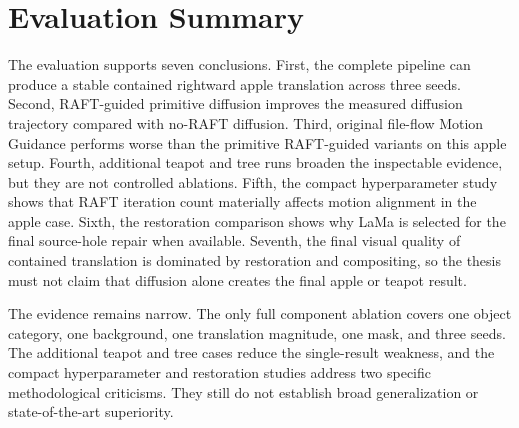 \section{Evaluation Summary}

The evaluation supports seven conclusions. First, the complete pipeline can produce a stable contained rightward apple translation across three seeds. Second, RAFT-guided primitive diffusion improves the measured diffusion trajectory compared with no-RAFT diffusion. Third, original file-flow Motion Guidance performs worse than the primitive RAFT-guided variants on this apple setup. Fourth, additional teapot and tree runs broaden the inspectable evidence, but they are not controlled ablations. Fifth, the compact hyperparameter study shows that RAFT iteration count materially affects motion alignment in the apple case. Sixth, the restoration comparison shows why LaMa is selected for the final source-hole repair when available. Seventh, the final visual quality of contained translation is dominated by restoration and compositing, so the thesis must not claim that diffusion alone creates the final apple or teapot result.

The evidence remains narrow. The only full component ablation covers one object category, one background, one translation magnitude, one mask, and three seeds. The additional teapot and tree cases reduce the single-result weakness, and the compact hyperparameter and restoration studies address two specific methodological criticisms. They still do not establish broad generalization or state-of-the-art superiority.

\FloatBarrier
